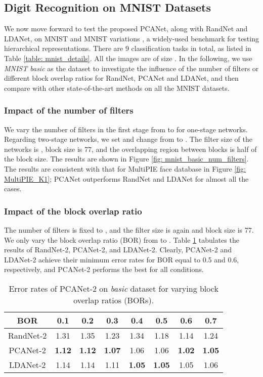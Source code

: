 \documentclass[10pt,journal,compsoc]{IEEEtran}
\begin{document}
\subsection{Digit Recognition on MNIST Datasets}
We now move forward to test the proposed PCANet, along with RandNet and LDANet, on MNIST \cite{LeCun1998} and MNIST variations \cite{Larochelle2007}, a widely-used benchmark for testing hierarchical representations. There are 9 classification tasks in total, as listed in Table \ref{table: mnist_details}. All the images are of size . In the following, we use {\em MNIST basic} as the dataset to investigate the influence of the number of filters or different block overlap ratios for RandNet, PCANet and LDANet, and then compare with other state-of-the-art methods on all the MNIST datasets.

\subsubsection{Impact of the number of filters}
We vary the number of filters in the first stage  from  to  for one-stage networks. Regarding two-stage networks, we set  and change  from  to . The filter size of the networks is , block size is 77, and the overlapping region between blocks is half of the block size. The results are shown in Figure \ref{fig: mnist_basic_num_filters}. The results are consistent with that for MultiPIE face database in Figure \ref{fig: MultiPIE_K1}; PCANet outperforms RandNet and LDANet for almost all the cases.

\subsubsection{Impact of the block overlap ratio}
The number of filters is fixed to , and the filter size is again  and block size is 77. We only vary the block overlap ratio (BOR) from  to . Table \ref{table: MNIST_basic_blockratio} tabulates the results of RandNet-2, PCANet-2, and LDANet-2. Clearly, PCANet-2 and LDANet-2 achieve their minimum error rates for BOR equal to 0.5 and 0.6, respectively, and PCANet-2 performs the best for all conditions.


\begin{table}\centering
\caption{Error rates  of PCANet-2 on {\em basic} dataset for varying block overlap ratios (BORs). }
\vspace{0.1cm}\begin{tabular}{c|c|c|c|c|c|c|c}
  \hline
BOR  & 0.1 & 0.2 & 0.3 & 0.4 & 0.5 & 0.6 & 0.7   \\ \hline \hline
  RandNet-2  & 1.31  & 1.35 & 1.23  & 1.34  & 1.18 & 1.14 & 1.24 \\
  PCANet-2   & {\bf 1.12} & {\bf 1.12} & {\bf 1.07} & 1.06 & 1.06 & {\bf 1.02}  & {\bf 1.05}  \\
  LDANet-2   & 1.14  &  1.14  &  1.11  &   {\bf 1.05}  &  {\bf 1.05}  &  1.05 &   1.06 \\
  \hline
\end{tabular}\label{table: MNIST_basic_blockratio}
\end{table}
\end{document}
